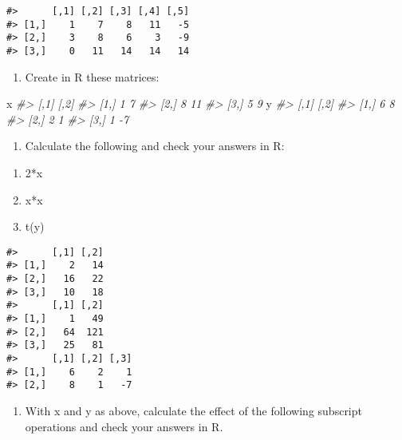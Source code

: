 \documentclass[
]{book}
\newenvironment{Shaded}{\begin{snugshade}}{\end{snugshade}}
\newcommand{\CommentTok}[1]{\textcolor[rgb]{0.56,0.35,0.01}{\textit{#1}}}
\newcommand{\NormalTok}[1]{#1}
\providecommand{\tightlist}{%
  \setlength{\itemsep}{0pt}\setlength{\parskip}{0pt}}
\begin{document}
\begin{verbatim}
#>      [,1] [,2] [,3] [,4] [,5]
#> [1,]    1    7    8   11   -5
#> [2,]    3    8    6    3   -9
#> [3,]    0   11   14   14   14
\end{verbatim}

\begin{enumerate}
\def\labelenumi{\arabic{enumi}.}
\setcounter{enumi}{1}
\tightlist
\item
  Create in R these matrices:
\end{enumerate}

\begin{Shaded}
\begin{Highlighting}[]
\NormalTok{x}
\CommentTok{\#\textgreater{}      [,1] [,2]}
\CommentTok{\#\textgreater{} [1,]    1    7}
\CommentTok{\#\textgreater{} [2,]    8   11}
\CommentTok{\#\textgreater{} [3,]    5    9}
\NormalTok{y}
\CommentTok{\#\textgreater{}      [,1] [,2]}
\CommentTok{\#\textgreater{} [1,]    6    8}
\CommentTok{\#\textgreater{} [2,]    2    1}
\CommentTok{\#\textgreater{} [3,]    1   {-}7}
\end{Highlighting}
\end{Shaded}

\begin{enumerate}
\def\labelenumi{\arabic{enumi}.}
\setcounter{enumi}{2}
\tightlist
\item
  Calculate the following and check your answers in R:
\end{enumerate}

\begin{enumerate}
\def\labelenumi{(\alph{enumi})}
\tightlist
\item
  2*x
\item
  x*x
\item
  t(y)
\end{enumerate}

\begin{verbatim}
#>      [,1] [,2]
#> [1,]    2   14
#> [2,]   16   22
#> [3,]   10   18
#>      [,1] [,2]
#> [1,]    1   49
#> [2,]   64  121
#> [3,]   25   81
#>      [,1] [,2] [,3]
#> [1,]    6    2    1
#> [2,]    8    1   -7
\end{verbatim}

\begin{enumerate}
\def\labelenumi{\arabic{enumi}.}
\setcounter{enumi}{3}
\tightlist
\item
  With x and y as above, calculate the effect of the following subscript operations and check
  your answers in R.
\end{enumerate}
\end{document}
